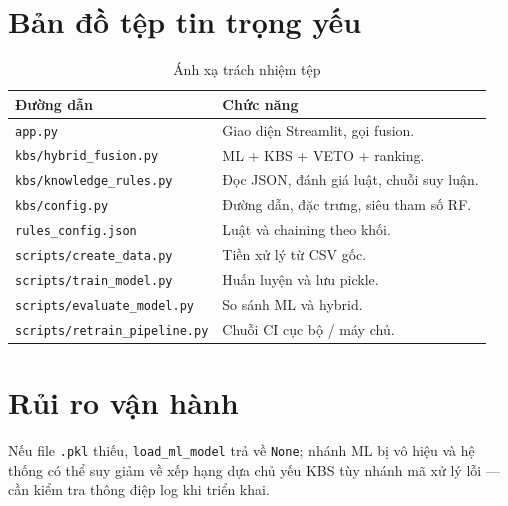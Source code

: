 \section{Bản đồ tệp tin trọng yếu}
\begin{table}[htbp]
\centering
\caption{Ánh xạ trách nhiệm tệp}
\small
\begin{tabular}{p{4.2cm}p{9cm}}
\toprule
Đường dẫn & Chức năng \\
\midrule
\texttt{app.py} & Giao diện Streamlit, gọi fusion. \\
\texttt{kbs/hybrid\_fusion.py} & ML + KBS + VETO + ranking. \\
\texttt{kbs/knowledge\_rules.py} & Đọc JSON, đánh giá luật, chuỗi suy luận. \\
\texttt{kbs/config.py} & Đường dẫn, đặc trưng, siêu tham số RF. \\
\texttt{rules\_config.json} & Luật và chaining theo khối. \\
\texttt{scripts/create\_data.py} & Tiền xử lý từ CSV gốc. \\
\texttt{scripts/train\_model.py} & Huấn luyện và lưu pickle. \\
\texttt{scripts/evaluate\_model.py} & So sánh ML và hybrid. \\
\texttt{scripts/retrain\_pipeline.py} & Chuỗi CI cục bộ / máy chủ. \\
\bottomrule
\end{tabular}
\end{table}

\section{Rủi ro vận hành}
Nếu file \texttt{.pkl} thiếu, \texttt{load\_ml\_model} trả về \texttt{None}; nhánh ML bị vô hiệu và hệ thống có thể suy giảm về xếp hạng dựa chủ yếu KBS tùy nhánh mã xử lý lỗi --- cần kiểm tra thông điệp log khi triển khai.
